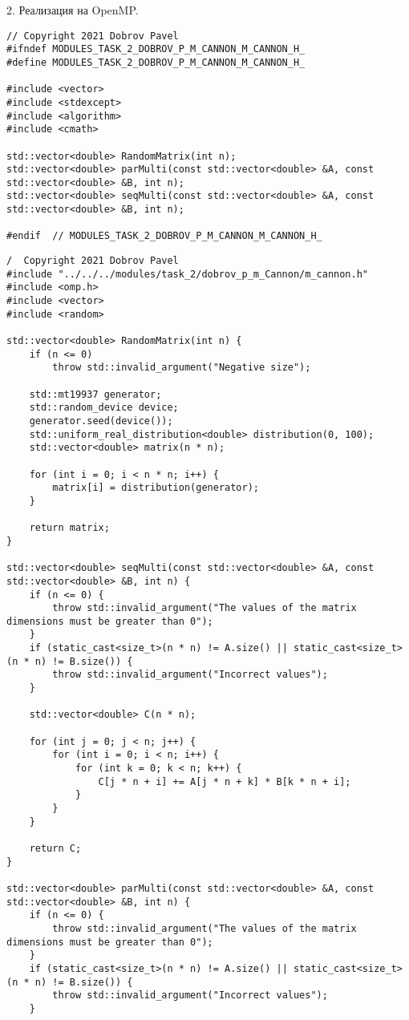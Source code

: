 \documentclass{report}
\begin{document}
\par 2. Реализация на OpenMP.
\begin{lstlisting}
// Copyright 2021 Dobrov Pavel
#ifndef MODULES_TASK_2_DOBROV_P_M_CANNON_M_CANNON_H_
#define MODULES_TASK_2_DOBROV_P_M_CANNON_M_CANNON_H_

#include <vector>
#include <stdexcept>
#include <algorithm>
#include <cmath>

std::vector<double> RandomMatrix(int n);
std::vector<double> parMulti(const std::vector<double> &A, const std::vector<double> &B, int n);
std::vector<double> seqMulti(const std::vector<double> &A, const std::vector<double> &B, int n);

#endif  // MODULES_TASK_2_DOBROV_P_M_CANNON_M_CANNON_H_
\end{lstlisting}
\begin{lstlisting}
/  Copyright 2021 Dobrov Pavel
#include "../../../modules/task_2/dobrov_p_m_Cannon/m_cannon.h"
#include <omp.h>
#include <vector>
#include <random>

std::vector<double> RandomMatrix(int n) {
    if (n <= 0)
        throw std::invalid_argument("Negative size");

    std::mt19937 generator;
    std::random_device device;
    generator.seed(device());
    std::uniform_real_distribution<double> distribution(0, 100);
    std::vector<double> matrix(n * n);

    for (int i = 0; i < n * n; i++) {
        matrix[i] = distribution(generator);
    }

    return matrix;
}

std::vector<double> seqMulti(const std::vector<double> &A, const std::vector<double> &B, int n) {
    if (n <= 0) {
        throw std::invalid_argument("The values of the matrix dimensions must be greater than 0");
    }
    if (static_cast<size_t>(n * n) != A.size() || static_cast<size_t>(n * n) != B.size()) {
        throw std::invalid_argument("Incorrect values");
    }

    std::vector<double> C(n * n);

    for (int j = 0; j < n; j++) {
        for (int i = 0; i < n; i++) {
            for (int k = 0; k < n; k++) {
                C[j * n + i] += A[j * n + k] * B[k * n + i];
            }
        }
    }

    return C;
}

std::vector<double> parMulti(const std::vector<double> &A, const std::vector<double> &B, int n) {
    if (n <= 0) {
        throw std::invalid_argument("The values of the matrix dimensions must be greater than 0");
    }
    if (static_cast<size_t>(n * n) != A.size() || static_cast<size_t>(n * n) != B.size()) {
        throw std::invalid_argument("Incorrect values");
    }


\end{lstlisting}
\end{document}
